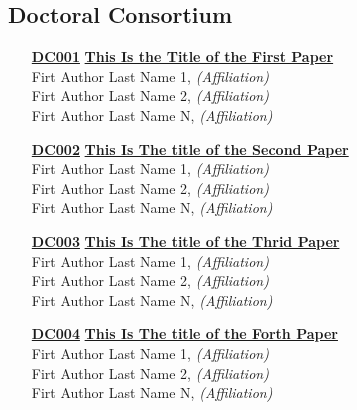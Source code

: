 \subsection{Doctoral Consortium}
\begin{enumerate}
\item[\href{https://doi.org/10.1145/1122445.1122456}{\textbf{DC001}}]
\href{https://doi.org/10.1145/1122445.1122456}{\textbf{This Is the Title of the First Paper}}\\
Firt Author Last Name 1, \emph{(Affiliation)}\\
Firt Author Last Name 2, \emph{(Affiliation)}\\
Firt Author Last Name N, \emph{(Affiliation)}\\

\item[\href{https://doi.org/10.1145/1122445.1122456}{\textbf{DC002}}]
\href{https://doi.org/10.1145/1122445.1122456}{\textbf{This Is The title of the Second Paper}}\\
Firt Author Last Name 1, \emph{(Affiliation)}\\
Firt Author Last Name 2, \emph{(Affiliation)}\\
Firt Author Last Name N, \emph{(Affiliation)}\\

\item[\href{https://doi.org/10.1145/1122445.1122456}{\textbf{DC003}}]
\href{https://doi.org/10.1145/1122445.1122456}{\textbf{This Is The title of the Thrid Paper}}\\
Firt Author Last Name 1, \emph{(Affiliation)}\\
Firt Author Last Name 2, \emph{(Affiliation)}\\
Firt Author Last Name N, \emph{(Affiliation)}\\

\item[\href{https://doi.org/10.1145/1122445.1122456}{\textbf{DC004}}]
\href{https://doi.org/10.1145/1122445.1122456}{\textbf{This Is The title of the Forth Paper}}\\
Firt Author Last Name 1, \emph{(Affiliation)}\\
Firt Author Last Name 2, \emph{(Affiliation)}\\
Firt Author Last Name N, \emph{(Affiliation)}\\
\end{enumerate}


